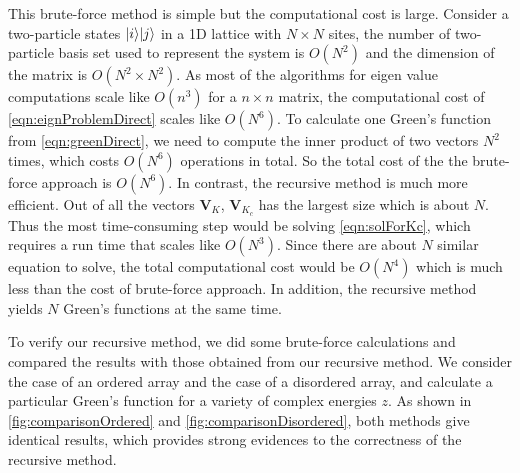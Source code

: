 This brute-force method is simple but the computational cost is large. Consider a 
two-particle states $| i \rangle| j \rangle$ in a 1D lattice with $N \times N$ sites, the number of two-particle basis set used
to represent the system is $O(N^2)$ and the dimension of the matrix is $O(N^2 \times N^2)$. As most of the 
algorithms for eigen value computations scale like $O(n^3)$ for a $n\times n$ matrix, the computational cost of
\autoref{eqn:eignProblemDirect} scales like $O(N^6)$. To calculate one Green's function from 
\autoref{eqn:greenDirect}, we need to compute the inner product of  two vectors $N^2$ times, which 
costs $O(N^6)$ operations in total. So the total cost of the the brute-force approach is $O(N^6)$. 
In contrast, the recursive method is much more efficient. Out of all the vectors $\mathbf{V}_{K}$,  $\mathbf{V}_{K_c}$
has the largest size which is about $N$. Thus the most time-consuming step would be solving \autoref{eqn:solForKc},
which requires a run time that scales like $O(N^3)$. Since there are about $N$ similar equation to solve, the total
computational cost would be $O(N^4)$ which is much less than the cost of brute-force approach. In addition, the
recursive method yields $N$ Green's functions at the same time.

To verify our recursive method, we did some brute-force calculations and compared the results with those obtained
from our recursive method. We consider the case of an ordered array and the case of a disordered array, and calculate
a particular Green's function for a variety of complex energies $z$. As shown in
 \autoref{fig:comparisonOrdered} and \autoref{fig:comparisonDisordered}, both methods give identical results, which
provides strong evidences to the correctness of the recursive method. 

